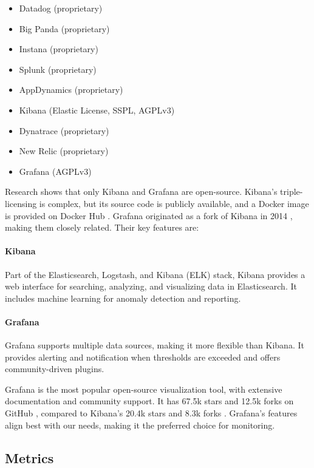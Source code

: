 \begin{multicols}{2} 
    \begin{itemize} 
        \item Datadog (proprietary) 
        \item Big Panda (proprietary) 
        \item Instana (proprietary) 
        \item Splunk (proprietary) 
        \item AppDynamics (proprietary) 
        \item Kibana (Elastic License, SSPL, AGPLv3) 
        \item Dynatrace (proprietary) 
        \item New Relic (proprietary) 
        \item Grafana (AGPLv3) 
    \end{itemize} 
\end{multicols}

Research shows that only Kibana and Grafana are open-source. Kibana's triple-licensing is complex, but its source code is publicly available, and a Docker image is provided on Docker Hub \cite{kibana-docker2025}. Grafana originated as a fork of Kibana in 2014 \cite{odegaard2019grafana}, making them closely related. Their key features are:

\paragraph{Kibana} Part of the Elasticsearch, Logstash, and Kibana (ELK) stack, Kibana provides a web interface for searching, analyzing, and visualizing data in Elasticsearch. It includes machine learning for anomaly detection and reporting.

\paragraph{Grafana} Grafana supports multiple data sources, making it more flexible than Kibana. It provides alerting and notification when thresholds are exceeded and offers community-driven plugins.

Grafana is the most popular open-source visualization tool, with extensive documentation and community support. It has 67.5k stars and 12.5k forks on GitHub \cite{grafana2025}, compared to Kibana's 20.4k stars and 8.3k forks \cite{kibana2025}. Grafana's features align best with our needs, making it the preferred choice for monitoring.

\subsection{Metrics}


